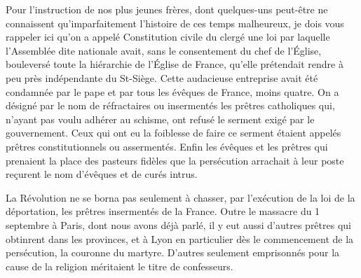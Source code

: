 Pour l'instruction de nos plus jeunes frères, dont quelques-uns peut-être ne connaissent qu'imparfaitement l'histoire de ces temps malheureux, je dois vous rappeler ici qu'on a appelé Constitution civile du clergé une loi par laquelle l'Assemblée dite nationale avait, sans le consentement du chef de l'Église, bouleversé toute la hiérarchie de l'Église de France, qu'elle prétendait rendre à peu près indépendante du St-Siège. Cette audacieuse entreprise avait été condamnée par le pape et par tous les évêques de France, moins quatre. On a désigné par le nom de réfractaires ou insermentés les prêtres catholiques qui, n'ayant pas voulu adhérer au schisme, ont refusé le serment exigé par le gouvernement. Ceux qui ont eu la foiblesse de faire ce serment étaient appelés prêtres constitutionnels ou assermentés. Enfin les évêques et les prêtres qui prenaient la place des pasteurs fidèles que la persécution arrachait à leur poste reçurent le nom d'évêques et de curés intrus.

La Révolution ne se borna pas seulement à chasser, par l'exécution de la loi de la déportation, les prêtres insermentés de la France. Outre le massacre du 1 septembre à Paris, dont nous avons déjà parlé, il y eut aussi d'autres prêtres qui obtinrent dans les provinces, et à Lyon en particulier dès le commencement de la
persécution, la couronne du martyre. D'autres seulement emprisonnés pour la cause de la religion méritaient le titre de confesseurs.

